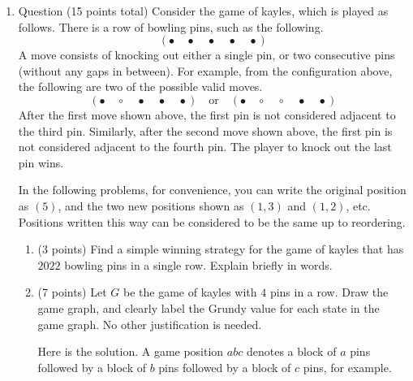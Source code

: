 \documentclass{amsart}
\begin{document}
\begin{enumerate}
\begin{enumerate}
\item (7 points) Convert your DFA or NFA into a regular expression. Show your work in every step.
\begin{solution}
First let us add a dummy start state \(s\) and a dummy accept state \(a\) as usual.
Then we remove each state in order.
\begin{enumerate}
\item Let's first remove \(q_1\). In this case, the label on \(s \to q_2\) gets updated to become \((0|1)^*1\)
\item Next let us remove \(q_2\). In this case, the label on \(s \to q_3\) gets updated to become \((0|1)^*1(0|1)\).
\item Finally let us remove \(q_3\). In this case, the label on \(s \to a\) gets updated to become \((0|1)^*1(0|1)\).
\end{enumerate}
The final answer is \((0|1)^*1(0|1)\).
\end{solution}
\end{enumerate}
\item Question (15 points total)
\label{sec:org7cd6644}
Consider the game of kayles, which is played as follows. There is a row of bowling pins, such as the following.
\[(\bullet \quad \bullet \quad \bullet \quad \bullet \quad \bullet)\]
A move consists of knocking out either a single pin, or two consecutive pins (without any gaps in between). For example, from the configuration above, the following are two of the possible valid moves.
\[(\bullet \quad \circ \quad \bullet \quad \bullet \quad \bullet)\quad \text{or}\quad (\bullet \quad \circ \quad \circ \quad \bullet \quad \bullet)\]
After the first move shown above, the first pin is not considered adjacent to the third pin. Similarly, after the second move shown above, the first pin is not considered adjacent to the fourth pin.
The player to knock out the last pin wins.

In the following problems, for convenience, you can write the original position as \((5)\), and the two new positions shown as \((1,3)\) and \((1,2)\), etc. Positions written this way can be considered to be the same up to reordering.

\begin{enumerate}
\item (3 points) Find a simple winning strategy for the game of kayles that has \(2022\) bowling pins in a single row. Explain briefly in words.

\item (7 points) Let \(G\) be the game of kayles with \(4\) pins in a row. Draw the game graph, and clearly label the Grundy value for each state in the game graph. No other justification is needed.
\begin{solution}
Here is the solution. A game position \(abc\) denotes a block of \(a\) pins followed by a block of \(b\) pins followed by a block of \(c\) pins, for example.


\end{solution}
\end{enumerate}
\end{enumerate}
\end{document}
